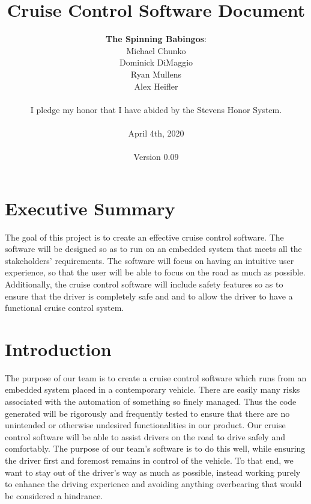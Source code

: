 \documentclass{article}
\title{\textbf{Cruise Control Software Document}}
\author{
	\textbf{The Spinning Babingos}: \\
	Michael Chunko \\
	Dominick DiMaggio \\
	Ryan Mullens \\
	Alex Heifler \\ \\
	I pledge my honor that I have abided by the Stevens Honor System. \\ \\
	April 4th, 2020 \\ \\
	Version 0.09
}
\date{}
\begin{document}
	
	\maketitle
	\newpage
	
	
	\pagestyle{plain}
	
	\tableofcontents
	
	\newpage
	
	\section{Executive Summary}
	\indent\indent The goal of this project is to create an effective cruise control software. The software will be designed so as to run on an embedded system that meets all the stakeholders’ requirements. The software will focus on having an intuitive user experience, so that the user will be able to focus on the road as much as possible. Additionally, the cruise control software will include safety features so as to ensure that the driver is completely safe and and to allow the driver to have a functional cruise control system. 	
	
	\section{Introduction}
	\indent\indent The purpose of our team is to create a cruise control software which runs from an embedded system placed in a contemporary vehicle. There are easily many risks associated with the automation of something so finely managed. Thus the code generated will be rigorously and frequently tested to ensure that there are no unintended or otherwise undesired functionalities in our product. Our cruise control software will be able to assist drivers on the road to drive safely and comfortably. The purpose of our team’s software is to do this well, while ensuring the driver first and foremost remains in control of the vehicle. To that end, we want to stay out of the driver’s way as much as possible, instead working purely to enhance the driving experience and avoiding anything overbearing that would be considered a hindrance. \\
	
\end{document}
